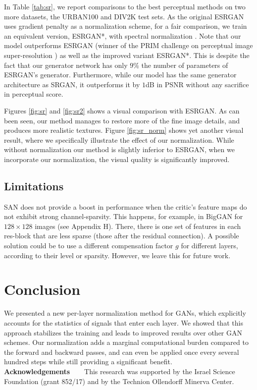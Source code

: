 \documentclass[letterpaper]{article} %
\begin{document}
In Table \ref{tab:sr}, we report comparisons to the best perceptual methods on two more datasets, the URBAN100 and DIV2K test sets. As the original ESRGAN \cite{esrgan} uses gradient penalty as a normalization scheme, for a fair comparison, we train an equivalent version, ESRGAN*, with spectral normalization \cite{spectral}. Note that our model outperforms ESRGAN (winner of the PRIM challenge on perceptual image super-resolution \cite{prim}) as well as the improved variant ESRGAN*. This is despite the fact that our generator network has only $9\%$ the number of parameters of ESRGAN's generator. Furthermore, while our model has the same generator architecture as SRGAN, it outperforms it by $1$dB in PSNR without any sacrifice in perceptual score.


Figures \ref{fig:sr} and \ref{fig:sr2} shows a visual comparison with ESRGAN. As can been seen, our method manages to restore more of the fine image details, and produces more realistic textures. Figure \ref{fig:sr_norm} shows yet another visual result, where we specifically illustrate the effect of our normalization. While without normalization our method is slightly inferior to ESRGAN, when we incorporate our normalization, the visual quality is significantly improved.


\subsection{Limitations}
SAN does not provide a boost in performance when the critic's feature maps do not exhibit strong channel-sparsity. This happens, for example, in BigGAN for $128\times128$ images (see Appendix H). There, there is one set of features in each res-block that are less sparse (those after the residual connection). A possible solution could be to use a different compensation factor $g$ for different layers, according to their level or sparsity. However, we leave this for future work.



\section{Conclusion}
We presented a new per-layer normalization method for GANs, which explicitly accounts for the statistics of signals that enter each layer. We showed that this approach stabilizes the training and leads to improved results over other GAN schemes. Our normalization adds a marginal computational burden compared to the forward and backward passes, and can even be applied once every several hundred steps while still providing a significant benefit.\\


\noindent\textbf{Acknowledgements\ \ \ }
This research was supported by the Israel Science Foundation (grant 852/17) and by the Technion Ollendorff Minerva Center.


\newpage
\appendixpage

\end{document}
